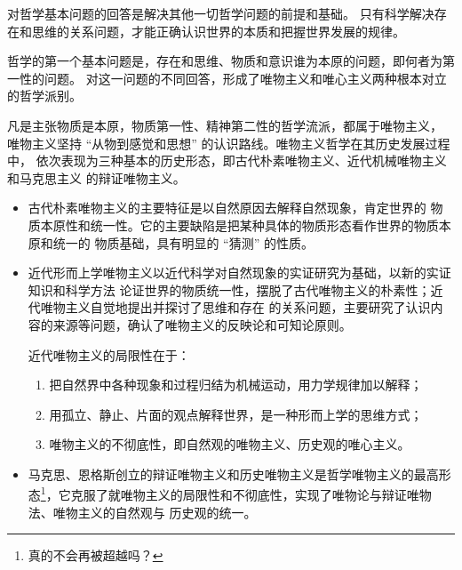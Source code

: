 \documentclass[10pt, UTF8]{book} %
\begin{document}
对哲学基本问题的回答是解决其他一切哲学问题的前提和基础。
只有科学解决存在和思维的关系问题，才能正确认识世界的本质和把握世界发展的规律。

{\small
\begin{mdframed}[frametitle={哲学的基本问题及其派别分类}]
    \quad\quad 哲学的第一个基本问题是，存在和思维、物质和意识谁为本原的问题，即何者为第一性的问题。
    对这一问题的不同回答，形成了唯物主义和唯心主义两种根本对立的哲学派别。
    
    
    凡是主张物质是本原，物质第一性、精神第二性的哲学流派，都属于唯物主义，
    唯物主义坚持 “从物到感觉和思想” 的认识路线。唯物主义哲学在其历史发展过程中，
    依次表现为三种基本的历史形态，即古代朴素唯物主义、近代机械唯物主义和马克思主义
    的辩证唯物主义。
    \begin{itemize}[itemsep=0pt]
        \item 古代朴素唯物主义的主要特征是以自然原因去解释自然现象，肯定世界的
        物质本原性和统一性。它的主要缺陷是把某种具体的物质形态看作世界的物质本原和统一的
        物质基础，具有明显的 “猜测” 的性质。
        \item 近代形而上学唯物主义以近代科学对自然现象的实证研究为基础，以新的实证知识和科学方法
        论证世界的物质统一性，摆脱了古代唯物主义的朴素性；近代唯物主义自觉地提出并探讨了思维和存在
        的关系问题，主要研究了认识内容的来源等问题，确认了唯物主义的反映论和可知论原则。
    
        近代唯物主义的局限性在于：
        \begin{enumerate}[label={${\arabic*}^\circ$}, itemsep=0pt]
            \item 把自然界中各种现象和过程归结为机械运动，用力学规律加以解释；
            \item 用孤立、静止、片面的观点解释世界，是一种形而上学的思维方式；
            \item 唯物主义的不彻底性，即自然观的唯物主义、历史观的唯心主义。
        \end{enumerate}
        \item 马克思、恩格斯创立的辩证唯物主义和历史唯物主义是哲学唯物主义的最高形态\footnote{
            真的不会再被超越吗？
        }，它克服了就唯物主义的局限性和不彻底性，实现了唯物论与辩证唯物法、唯物主义的自然观与
        历史观的统一。
    \end{itemize}
    

\end{mdframed}}
\end{document}

